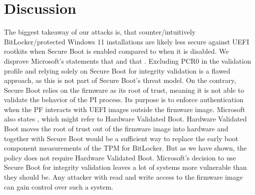 


\chapter{Discussion}
\label{sec:discussion}

The biggest takeaway of our attacks is, that counter\-/intuitively BitLocker\-/protected Windows 11 installations are likely less secure against \ac{UEFI} rootkits when Secure Boot is enabled compared to when it is disabled.
We disprove Microsoft's statements that  and that .
Excluding \ac{PCR}0 in the validation profile and relying solely on Secure Boot for integrity validation is a flawed approach, as this is not part of Secure Boot's threat model.
On the contrary, Secure Boot relies on the firmware as its root of trust, meaning it is not able to validate the behavior of the \ac{PI} process.
Its purpose is to enforce authentication when the \ac{PF} interacts with \ac{UEFI} images outside the firmware image.
Microsoft also states , which might refer to Hardware Validated Boot.
Hardware Validated Boot moves the root of trust out of the firmware image into hardware and together with Secure Boot would be a sufficient way to replace the early boot component measurements of the \ac{TPM} for BitLocker.
But as we have shown, the policy does not require Hardware Validated Boot.
Microsoft's decision to use Secure Boot for integrity validation leaves a lot of systems more vulnerable than they should be.
Any attacker with read and write access to the firmware image can gain control over such a system.
